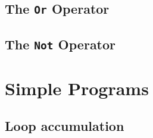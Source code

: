     
    \subsection{The \texttt{Or} Operator}\label{evaln:ops:or}
        
    
        
    
        
        
        
    
    \subsection{The \texttt{Not} Operator}\label{evaln:ops:not}
        
        
        

\newpage


\section{Simple Programs}\label{evaln:progs}
    \subsection{Loop accumulation}
        
